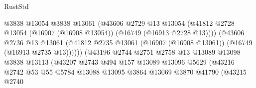 \begin{lexlean}{RustStd}
\begin{coremodule}
                                          @3838
                                          @13054
                                          @3838
                                          @13061
                                          (@43606
                                            @2729
                                            @13
                                            @13054
                                            (@41812
                                              @2728
                                              @13054
                                              (@16907 (@16908 @13054))
                                              (@16749 (@16913 @2728 @13))))
                                          (@43606
                                            @2736
                                            @13
                                            @13061
                                            (@41812
                                              @2735
                                              @13061
                                              (@16907 (@16908 @13061))
                                              (@16749 (@16913 @2735 @13))))))
                                      (@43196
                                        @2744
                                        @2751
                                        @2758
                                        @13
                                        @13089
                                        @13098
                                        @3838
                                        @13113
                                        (@43207
                                          @2743
                                          @494
                                          @157
                                          @13089
                                          @13096
                                          @5629
                                          (@43216
                                            @2742
                                            @53
                                            @55
                                            @5784
                                            @13088
                                            @13095
                                            @3864
                                            @13069
                                            @3870
                                            @41790
                                            (@43215
                                              @2740

\end{coremodule}
\end{lexlean}
